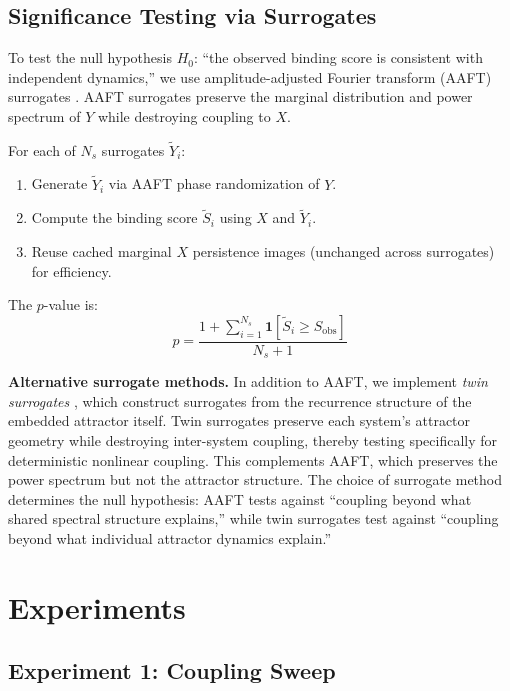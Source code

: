\documentclass[11pt,a4paper]{article}
\begin{document}
\subsection{Significance Testing via Surrogates}\label{sec:significance}

To test the null hypothesis $H_0$: ``the observed binding score is consistent with independent dynamics,'' we use amplitude-adjusted Fourier transform (AAFT) surrogates \citep{schreiber1996improved}.
AAFT surrogates preserve the marginal distribution and power spectrum of $Y$ while destroying coupling to $X$.

For each of $N_s$ surrogates $\tilde{Y}_i$:
\begin{enumerate}
    \item Generate $\tilde{Y}_i$ via AAFT phase randomization of $Y$.
    \item Compute the binding score $\tilde{S}_i$ using $X$ and $\tilde{Y}_i$.
    \item Reuse cached marginal $X$ persistence images (unchanged across surrogates) for efficiency.
\end{enumerate}

The $p$-value is:
\begin{equation}
    p = \frac{1 + \sum_{i=1}^{N_s} \mathbf{1}[\tilde{S}_i \geq S_{\text{obs}}]}{N_s + 1}
\end{equation}

\textbf{Alternative surrogate methods.}
In addition to AAFT, we implement \emph{twin surrogates} \citep{thiel2006twin}, which construct surrogates from the recurrence structure of the embedded attractor itself.
Twin surrogates preserve each system's attractor geometry while destroying inter-system coupling, thereby testing specifically for deterministic nonlinear coupling.
This complements AAFT, which preserves the power spectrum but not the attractor structure.
The choice of surrogate method determines the null hypothesis: AAFT tests against ``coupling beyond what shared spectral structure explains,'' while twin surrogates test against ``coupling beyond what individual attractor dynamics explain.''


\section{Experiments}

\subsection{Experiment 1: Coupling Sweep}\label{sec:exp-sweep}
\end{document}
